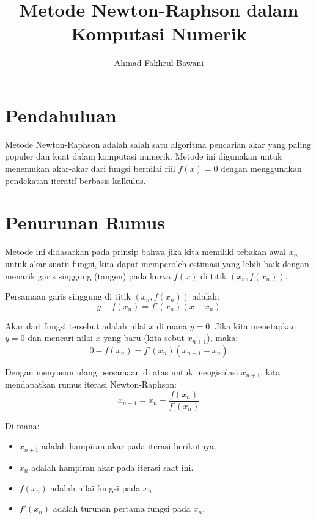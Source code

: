 \documentclass[12pt,a4paper]{article}
\title{Metode Newton-Raphson dalam Komputasi Numerik}
\author{Ahmad Fakhrul Bawani}
\date{}
\begin{document}
\maketitle

\section{Pendahuluan}
Metode Newton-Raphson adalah salah satu algoritma pencarian akar yang paling populer dan kuat dalam komputasi numerik. Metode ini digunakan untuk menemukan akar-akar dari fungsi bernilai riil $f(x) = 0$ dengan menggunakan pendekatan iteratif berbasis kalkulus.

\section{Penurunan Rumus}
Metode ini didasarkan pada prinsip bahwa jika kita memiliki tebakan awal $x_n$ untuk akar suatu fungsi, kita dapat memperoleh estimasi yang lebih baik dengan menarik garis singgung (tangen) pada kurva $f(x)$ di titik $(x_n, f(x_n))$.

Persamaan garis singgung di titik $(x_n, f(x_n))$ adalah:
\begin{equation}
y - f(x_n) = f'(x_n)(x - x_n)
\end{equation}

Akar dari fungsi tersebut adalah nilai $x$ di mana $y = 0$. Jika kita menetapkan $y = 0$ dan mencari nilai $x$ yang baru (kita sebut $x_{n+1}$), maka:
\begin{equation}
0 - f(x_n) = f'(x_n)(x_{n+1} - x_n)
\end{equation}

Dengan menyusun ulang persamaan di atas untuk mengisolasi $x_{n+1}$, kita mendapatkan rumus iterasi Newton-Raphson:
\begin{equation}
x_{n+1} = x_n - \frac{f(x_n)}{f'(x_n)}
\end{equation}

Di mana:
\begin{itemize}
  \item $x_{n+1}$ adalah hampiran akar pada iterasi berikutnya.
  \item $x_n$ adalah hampiran akar pada iterasi saat ini.
  \item $f(x_n)$ adalah nilai fungsi pada $x_n$.
  \item $f'(x_n)$ adalah turunan pertama fungsi pada $x_n$.
\end{itemize}
\end{document}
